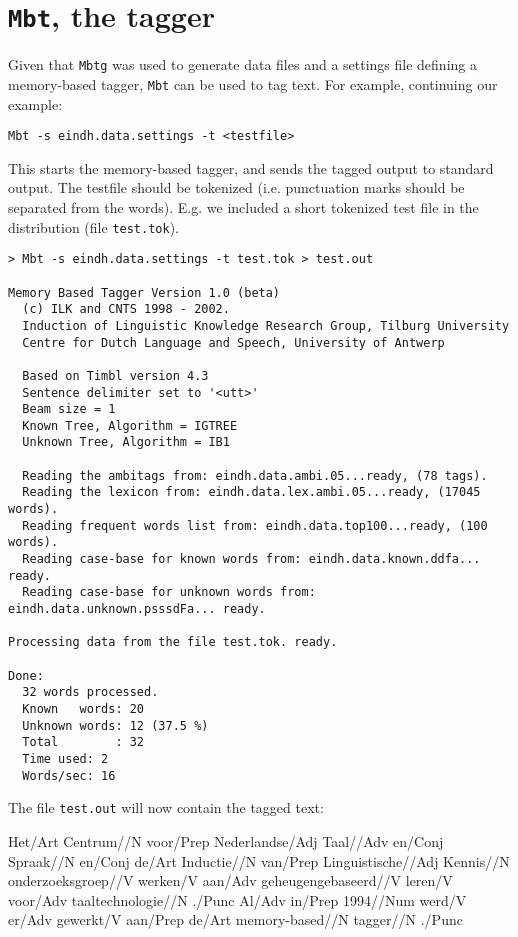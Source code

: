\documentclass{report}
\begin{document}
\section{{\tt Mbt}, the tagger}

Given that {\tt Mbtg} was used to generate data files and a settings file
defining a memory-based tagger, {\tt Mbt} can be used to tag text. For
example, continuing our example:

{\small
\begin{verbatim}
Mbt -s eindh.data.settings -t <testfile>
\end{verbatim}
}

This starts the memory-based tagger, and sends the tagged output to
standard output. The testfile should be tokenized (i.e. punctuation
marks should be separated from the words). E.g. we included a short
tokenized test file in the distribution (file {\tt test.tok}).

{\small
\begin{verbatim}
> Mbt -s eindh.data.settings -t test.tok > test.out

Memory Based Tagger Version 1.0 (beta)
  (c) ILK and CNTS 1998 - 2002.
  Induction of Linguistic Knowledge Research Group, Tilburg University
  Centre for Dutch Language and Speech, University of Antwerp

  Based on Timbl version 4.3
  Sentence delimiter set to '<utt>'
  Beam size = 1
  Known Tree, Algorithm = IGTREE
  Unknown Tree, Algorithm = IB1

  Reading the ambitags from: eindh.data.ambi.05...ready, (78 tags).
  Reading the lexicon from: eindh.data.lex.ambi.05...ready, (17045 words).
  Reading frequent words list from: eindh.data.top100...ready, (100 words).
  Reading case-base for known words from: eindh.data.known.ddfa... ready.
  Reading case-base for unknown words from: eindh.data.unknown.psssdFa... ready.

Processing data from the file test.tok. ready.

Done:
  32 words processed.
  Known   words: 20
  Unknown words: 12 (37.5 %)
  Total        : 32
  Time used: 2
  Words/sec: 16
\end{verbatim}
}

The file {\tt test.out} will now contain the tagged text:

{\small 
Het/Art Centrum//N voor/Prep Nederlandse/Adj Taal//Adv en/Conj
Spraak//N en/Conj de/Art Inductie//N van/Prep Linguistische//Adj
Kennis//N onderzoeksgroep//V werken/V aan/Adv geheugengebaseerd//V
leren/V voor/Adv taaltechnologie//N ./Punc Al/Adv in/Prep 1994//Num
werd/V er/Adv gewerkt/V aan/Prep de/Art memory-based//N tagger//N
./Punc
}
\end{document}
